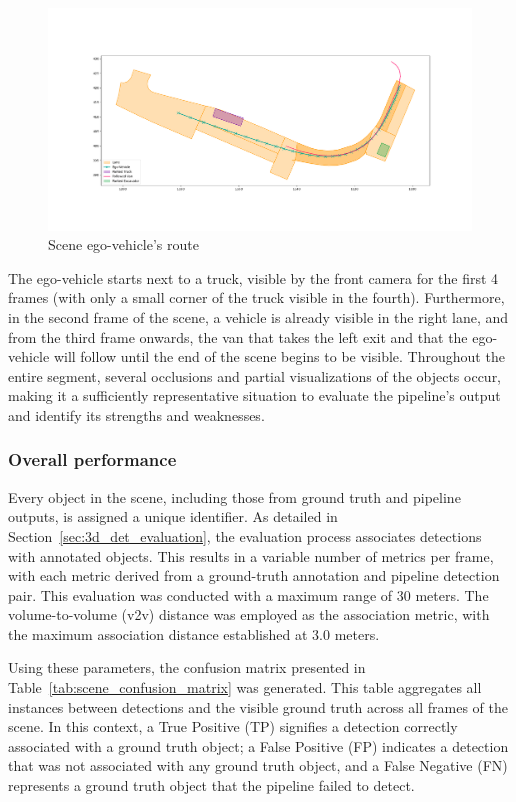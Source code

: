\begin{figure}[h!]
    \centering
    \includegraphics[width=\linewidth]{./images/experiments/ground_truth_scene.png}
    \caption{Scene ego-vehicle's route}
    \label{fig:scene_ego_path}
\end{figure}

The ego-vehicle starts next to a truck, visible by the front camera for the first 4 frames (with only a small corner of the truck visible in the fourth). Furthermore, in the second frame of the scene, a vehicle is already visible in the right lane, and from the third frame onwards, the van that takes the left exit and that the ego-vehicle will follow until the end of the scene begins to be visible. Throughout the entire segment, several occlusions and partial visualizations of the objects occur, making it a sufficiently representative situation to evaluate the pipeline's output and identify its strengths and weaknesses.


\subsubsection{Overall performance}
Every object in the scene, including those from ground truth and pipeline outputs, is assigned a unique identifier. As detailed in Section~\ref{sec:3d_det_evaluation}, the evaluation process associates detections with annotated objects. This results in a variable number of metrics per frame, with each metric derived from a ground-truth annotation and pipeline detection pair. This evaluation was conducted with a  maximum range of $30$ meters. The volume-to-volume (v2v) distance was employed as the association metric, with the maximum association distance established at $3.0$ meters.

Using these parameters, the confusion matrix presented in Table~\ref{tab:scene_confusion_matrix} was generated. This table aggregates all instances between detections and the visible ground truth across all frames of the scene. In this context, a True Positive (TP) signifies a detection correctly associated with a ground truth object; a False Positive (FP) indicates a detection that was not associated with any ground truth object, and a False Negative (FN) represents a ground truth object that the pipeline failed to detect.


